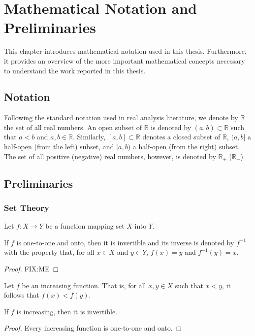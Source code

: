 \chapter{Mathematical Notation and Preliminaries} %
\label{cha:notation}

\minitoc
\vspace{10mm}

This chapter introduces mathematical notation used in this thesis. Furthermore, it provides an overview of the more important mathematical concepts necessary to understand the work reported in this thesis.

\section{Notation} %
\label{sec:notation_notation}
Following the standard notation used in real analysis literature, we denote by $\mathbb{R}$ the set of all real numbers. An open subset of $\mathbb{R}$ is denoted by $(a,b)\subset \mathbb{R}$ such that $a < b$ and $a,b\in\mathbb{R}$. Similarly, $[a,b]\subset\mathbb{R}$ denotes a closed subset of $\mathbb{R}$, $(a,b]$ a half-open (from the left) subset, and $[a,b)$ a half-open (from the right) subset. The set of all positive (negative) real numbers, however, is denoted by $\mathbb{R}_+$ ($\mathbb{R}_-$).

\section{Preliminaries} %
\label{sec:preliminaries_notation}

\subsection{Set Theory} %
\label{sub:set_theory_notation}
Let $f: X\to Y$ be a function mapping set $X$ into $Y$.
\begin{thm}
\label{thm:inverse_of_a_function_notation}
If $f$ is one-to-one and onto, then it is invertible and its inverse is denoted by $f^{-1}$ with the property that, for all $x\in X$ and $y\in Y$, $f(x)=y$ and $f^{-1}(y) = x$.
\end{thm}
\begin{proof}
FIX:ME
\end{proof}

Let $f$ be an increasing function. That is, for all $x,y\in X$ such that $x < y$, it follows that $f(x) < f(y)$.
\begin{corollary}
\label{cor:increasing_invertible_notation}
If $f$ is increasing, then it is invertible.
\end{corollary}
\begin{proof}
Every increasing function is one-to-one and onto.
\end{proof}

